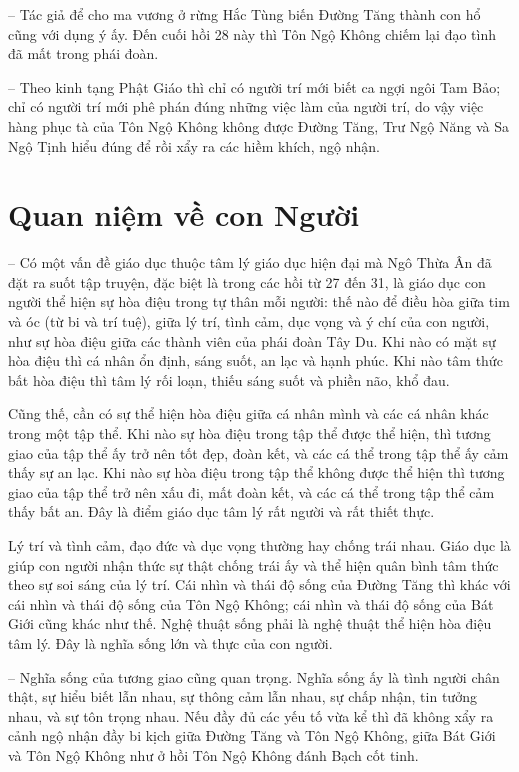 -- Tác giả để cho ma vương ở rừng Hắc Tùng biến Đường Tăng thành con hổ cũng với dụng ý ấy. Đến cuối hồi 28 này thì Tôn Ngộ Không chiếm lại đạo tình đã mất trong phái đoàn.

-- Theo kinh tạng Phật Giáo thì chỉ có người trí mới biết ca ngợi ngôi Tam Bảo; chỉ có người trí mới phê phán đúng những việc làm của người trí, do vậy việc hàng phục tà của Tôn Ngộ Không không được Đường Tăng, Trư Ngộ Năng và Sa Ngộ Tịnh hiểu đúng để rồi xẩy ra các hiềm khích, ngộ nhận.

\section{Quan niệm về con Người} %
\label{sec:27_28_con_nguoi}

-- Có một vấn đề giáo dục thuộc tâm lý giáo dục hiện đại mà Ngô Thừa Ân đã đặt ra suốt tập truyện, đặc biệt là trong các hồi từ 27 đến 31, là giáo dục con người thể hiện sự hòa điệu trong tự thân mỗi người: thế nào để điều hòa giữa tim và óc (từ bi và trí tuệ), giữa lý trí, tình cảm, dục vọng và ý chí của con người, như sự hòa điệu giữa các thành viên của phái đoàn Tây Du. Khi nào có mặt sự hòa điệu thì cá nhân ổn định, sáng suốt, an lạc và hạnh phúc. Khi nào tâm thức bất hòa điệu thì tâm lý rối loạn, thiếu sáng suốt và phiền não, khổ đau.

Cũng thế, cần có sự thể hiện hòa điệu giữa cá nhân mình và các cá nhân khác trong một tập thể. Khi nào sự hòa điệu trong tập thể được thể hiện, thì tương giao của tập thể ấy trở nên tốt đẹp, đoàn kết, và các cá thể trong tập thể ấy cảm thấy sự an lạc. Khi nào sự hòa điệu trong tập thể không được thể hiện thì tương giao của tập thể trở nên xấu đi, mất đoàn kết, và các cá thể trong tập thể cảm thấy bất an. Đây là điểm giáo dục tâm lý rất người và rất thiết thực.

Lý trí và tình cảm, đạo đức và dục vọng thường hay chống trái nhau. Giáo dục là giúp con người nhận thức sự thật chống trái ấy và thể hiện quân bình tâm thức theo sự soi sáng của lý trí. Cái nhìn và thái độ sống của Đường Tăng thì khác với cái nhìn và thái độ sống của Tôn Ngộ Không; cái nhìn và thái độ sống của Bát Giới cũng khác như thế. Nghệ thuật sống phải là nghệ thuật thể hiện hòa điệu tâm lý. Đây là nghĩa sống lớn và thực của con người.

-- Nghĩa sống của tương giao cũng quan trọng. Nghĩa sống ấy là tình người chân thật, sự hiểu biết lẫn nhau, sự thông cảm lẫn nhau, sự chấp nhận, tin tưởng nhau, và sự tôn trọng nhau. Nếu đầy đủ các yếu tố vừa kể thì đã không xẩy ra cảnh ngộ nhận đầy bi kịch giữa Đường Tăng và Tôn Ngộ Không, giữa Bát Giới và Tôn Ngộ Không như ở hồi Tôn Ngộ Không đánh Bạch cốt tinh.

